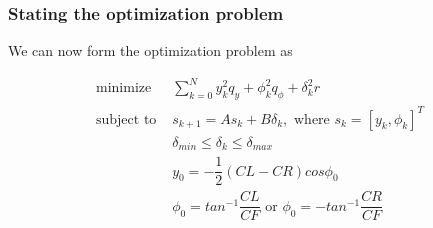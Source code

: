 \subsubsection{Stating the optimization problem}

We can now form the optimization problem as

\begin{align}
  \text{minimize }    & \sum\limits_{k=0}^N y_k^2 q_y + \phi_k^2 q_{\phi} + \delta_k^2 r \\
  \text{subject to }  & s_{k+1} = A s_k + B \delta_k,\text{ where } s_k = [y_k, \phi_k]^T \\
                      & \delta_{min} \leq \delta_k \leq \delta_{max} \\
                      & y_0 = -\dfrac{1}{2}(CL-CR)cos\phi_0 \\
                      & \phi_0 = tan^{-1}\dfrac{CL}{CF} \text{ or } \phi_0 = -tan^{-1}\dfrac{CR}{CF}
\end{align}
